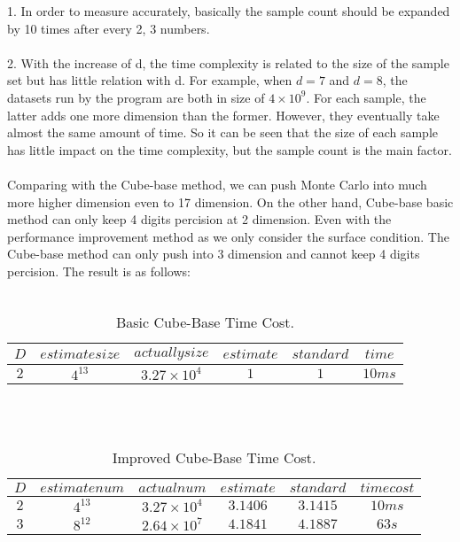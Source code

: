 \documentclass{article}
\begin{document}
		1. In order to measure accurately, basically the sample count should be expanded by 10 times after every 2, 3 numbers. 
		\\
		\\
		2. With the increase of d, the time complexity is related to the size of the sample set but has little relation with d. For example, when $d=7$ and $d=8$, the datasets run by the program are both in size of $4 \times 10^9$. For each sample, the latter adds one more dimension than the former. However, they eventually take almost the same amount of time. So it can be seen that the size of each sample has little impact on the time complexity, but the sample count is the main factor.
		\\
		\\
		Comparing with the Cube-base method, we can push Monte Carlo into much more higher dimension even to 17 dimension. On the other hand, Cube-base basic method can only keep 4 digits percision at 2 dimension. Even with the performance improvement method as we only consider the surface condition. The Cube-base method can only push into 3 dimension and cannot keep 4 digits percision. The result is as follows:
		\\
		\\
		\begin{table}[htbp]
		\centering
		\begin{tabular}{cccccc}  %
			\hline
			$D$ &$estimate size$ &$actually size$ &$estimate$ &$standard$ &$time$\\
			\hline
			$2$ &$4^{13}$ &$3.27\times10^4$ &$1$ &$1$ &$10ms$\\
			\hline
		\end{tabular}
		\caption{Basic Cube-Base Time Cost.}
		\label{table:table2}
		\end{table}
		\\
		\\
		\begin{table}[htbp]
		\centering
		\begin{tabular}{cccccc}  %
			\hline
			$D$ &$estimate num$ &$actual num$ &$estimate$ &$standard$ &$time cost$\\
			\hline
			$2$ &$4^{13}$ &$3.27\times10^4$ &$3.1406$ &$3.1415$ &$10ms$\\
			$3$ &$8^{12}$ &$2.64\times10^7$ &$4.1841$ &$4.1887$ &$63s$\\
			\hline
		\end{tabular}
		\caption{Improved Cube-Base Time Cost.}
		\label{table:table3}
		\end{table}
\end{document}
